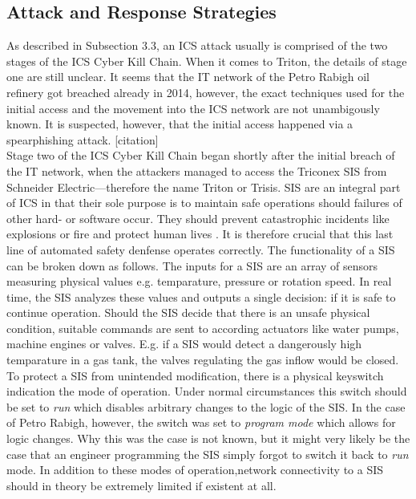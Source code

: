 \documentclass[runningheads]{llncs}
\begin{document}
\subsection{Attack and Response Strategies}
As described in Subsection 3.3, an ICS attack usually is comprised of the two stages of the ICS Cyber Kill Chain.
When it comes to Triton, the details of stage one are still unclear.
It seems that the IT network of the Petro Rabigh oil refinery got breached already in 2014, however, the exact techniques used for the initial access and the movement into the ICS network are not unambigously known.
It is suspected, however, that the initial access happened via a spearphishing attack. [citation]\\
Stage two of the ICS Cyber Kill Chain began shortly after the initial breach of the IT network, when the attackers managed to access the Triconex SIS from Schneider Electric---therefore the name Triton or Trisis.
SIS are an integral part of ICS in that their sole purpose is to maintain safe operations should failures of other hard- or software occur.
They should prevent catastrophic incidents like explosions or fire and protect human lives \cite{pinto.18}.
It is therefore crucial that this last line of automated safety denfense operates correctly.
The functionality of a SIS can be broken down as follows.
The inputs for a SIS are an array of sensors measuring physical values e.g. temparature, pressure or rotation speed.
In real time, the SIS analyzes these values and outputs a single decision: if it is safe to continue operation.
Should the SIS decide that there is an unsafe physical condition, suitable commands are sent to according actuators like water pumps, machine engines or valves.
E.g. if a SIS would detect a dangerously high temparature in a gas tank, the valves regulating the gas inflow would be closed. \cite{dragos.17} \\
To protect a SIS from unintended modification, there is a physical keyswitch indication the mode of operation.
Under normal circumstances this switch should be set to \textit{run} which disables arbitrary changes to the logic of the SIS.
In the case of Petro Rabigh, however, the switch was set to \textit{program mode} which allows for logic changes.
Why this was the case is not known, but it might very likely be the case that an engineer programming the SIS simply forgot to switch it back to \textit{run} mode.
In addition to these modes of operation,network connectivity to a SIS should in theory be extremely limited if existent at all.
\end{document}
